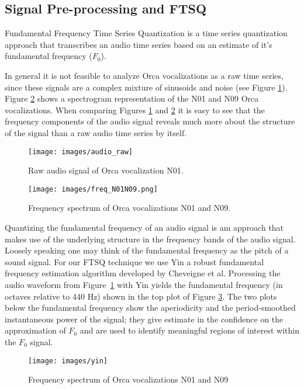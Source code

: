 \subsection{Signal Pre-processing and FTSQ}

Fundamental Frequency Time Series Quantization is a time series
quantization approach that transcribes an audio time series based on
an estimate of it's fundamental frequency ($F_0$).

In general it is not feasible to analyze Orca vocalizations as a raw
time series, since these signals are a complex mixture of sinusoids and
noise (see Figure \ref{fig:audio_raw}).  Figure \ref{fig:freqspec}
shows a spectrogram representation of the N01 and N09 Orca
vocalizations.  When comparing Figures \ref{fig:audio_raw} and
\ref{fig:freqspec} it is easy to see that the frequency components of
the audio signal reveals much more about the structure of the signal
than a raw audio time series by itself.

\begin{figure}[h]
\centering
\texttt{[image: images/audio\_raw]}
\caption{Raw audio signal of Orca vocalization N01.}
\label{fig:audio_raw}
\end{figure}
\begin{figure}[h]
\centering
\texttt{[image: images/freq\_N01N09.png]}
\caption{Frequency spectrum of Orca vocalizations N01 and N09.}
\label{fig:freqspec}
\end{figure}

Quantizing the fundamental frequency of an audio signal is am approach that makes 
use of the underlying structure in the frequency bands of the audio signal.
Loosely speaking one may think of the fundamental frequency as the pitch of a sound signal.
For our FTSQ technique we use Yin \cite{Cheveigne2002} a robust fundamental frequency 
estimation algorithm developed by Cheveigne et al.
Processing the audio waveform from Figure~\ref{fig:audio_raw} with Yin yields the 
fundamental frequency (in octaves relative to 440 Hz) shown in the top plot of Figure \ref{fig:yin}.
The two plots below the fundamental frequency show the aperiodicity and the
period-smoothed instantaneous power of the signal; they give estimate in the 
confidence on the approximation of $F_0$ and are used to identify meaningful
regions of interest within the $F_0$ signal.
\begin{figure}[h]
\centering
\texttt{[image: images/yin]}
\caption{Frequency spectrum of Orca vocalizations N01 and N09}
\label{fig:yin}
\end{figure}


